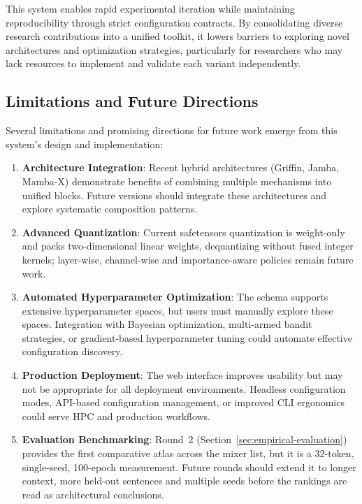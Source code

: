 This system enables rapid experimental iteration while maintaining reproducibility through strict configuration contracts. By consolidating diverse research contributions into a unified toolkit, it lowers barriers to exploring novel architectures and optimization strategies, particularly for researchers who may lack resources to implement and validate each variant independently.

\subsection{Limitations and Future Directions}

Several limitations and promising directions for future work emerge from this system's design and implementation:

\begin{enumerate}[leftmargin=*]
    \item \textbf{Architecture Integration}: Recent hybrid architectures (Griffin, Jamba, Mamba-X) demonstrate benefits of combining multiple mechanisms into unified blocks. Future versions should integrate these architectures and explore systematic composition patterns.
    
    \item \textbf{Advanced Quantization}: Current safetensors quantization is weight-only and packs two-dimensional linear weights, dequantizing without fused integer kernels; layer-wise, channel-wise and importance-aware policies remain future work.
    
    \item \textbf{Automated Hyperparameter Optimization}: The schema supports extensive hyperparameter spaces, but users must manually explore these spaces. Integration with Bayesian optimization, multi-armed bandit strategies, or gradient-based hyperparameter tuning could automate effective configuration discovery.
    
    \item \textbf{Production Deployment}: The web interface improves usability but may not be appropriate for all deployment environments. Headless configuration modes, API-based configuration management, or improved CLI ergonomics could serve HPC and production workflows.
    
    \item \textbf{Evaluation Benchmarking}: Round~2 (Section~\ref{sec:empirical-evaluation}) provides the first comparative atlas across the mixer list, but it is a 32-token, single-seed, 100-epoch measurement. Future rounds should extend it to longer context, more held-out sentences and multiple seeds before the rankings are read as architectural conclusions.
    

\end{enumerate}
